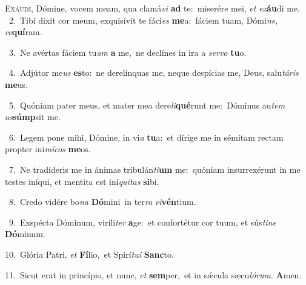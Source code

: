 \lettrine{\initial\textcolor{\initialcolor}{E}}{xáudi,} Dómine, vocem meam, qua clamá\textit{vi} \textbf{ad} te:~\star miserére mei, \textit{et} \textit{ex}\-\textbf{áu}di me.\\
{\numbfont\textcolor{\numbcolor}{~2.}}~Tibi dixit cor meum, exquisívit te fáci\textit{es} \textbf{me}\-a:~\star fáciem tuam, Dómi\-\textit{ne}\-, \textit{re}\-\textbf{quí}ram.\par
{\numbfont\textcolor{\numbcolor}{~3.}}~Ne avértas fáciem tu\textit{am} \textbf{a} me,~\star ne declínes in ira a \textit{ser}\-\textit{vo} \textbf{tu}\-o.\par
{\numbfont\textcolor{\numbcolor}{~4.}}~Adjútor me\textit{us} \textbf{es}\-to:~\star ne derelínquas me, neque despícias me, Deus, salu\-\textit{tá}\-\textit{ris} \textbf{me}\-us.\par
{\numbfont\textcolor{\numbcolor}{~5.}}~Quóniam pater meus, et mater mea dere\-\textit{li}\-\textbf{qué}runt me:~\star Dóminus au\textit{tem} \textit{as}\-\textbf{súmp}sit me.\par
{\numbfont\textcolor{\numbcolor}{~6.}}~Legem pone mihi, Dómine, in vi\textit{a} \textbf{tu}\-a:~\star et dírige me in sémitam rectam propter ini\-\textit{mí}\-\textit{cos} \textbf{me}\-os.\par
{\numbfont\textcolor{\numbcolor}{~7.}}~Ne tradíderis me in ánimas tribulán\-\textit{ti}\-\textbf{um} me:~\star quóniam insurrexérunt in me testes iníqui, et mentíta est iní\-\textit{qui}\-\textit{tas} \textbf{si}\-bi.\par
{\numbfont\textcolor{\numbcolor}{~8.}}~Credo vidére bo\textit{na} \textbf{Dó}\-mini~\star in ter\textit{ra} \textit{vi}\-\textbf{vén}tium.\par
{\numbfont\textcolor{\numbcolor}{~9.}}~Exspécta Dóminum, viríli\textit{ter} \textbf{a}\-ge:~\star et confortétur cor tuum, et sús\-\textit{ti}\-\textit{ne} \textbf{Dó}\-minum.\par
{\numbfont\textcolor{\numbcolor}{10.}}~Glória Patri, \textit{et} \textbf{Fí}\-lio,~\star et Spirí\-\textit{tu}\-\textit{i} \textbf{Sanc}\-to.\par
{\numbfont\textcolor{\numbcolor}{11.}}~Sicut erat in princípio, et nunc, \textit{et} \textbf{sem}\-per,~\star et in sǽcula sæcu\-\textit{ló}\-\textit{rum}. \textbf{A}\-men.\par

